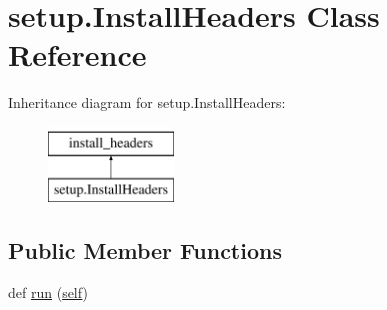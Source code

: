 \hypertarget{classsetup_1_1_install_headers}{}\section{setup.\+Install\+Headers Class Reference}
\label{classsetup_1_1_install_headers}
Inheritance diagram for setup.\+Install\+Headers\+:\begin{figure}[H]
\begin{center}
\leavevmode
\includegraphics[height=2.000000cm]{classsetup_1_1_install_headers}
\end{center}
\end{figure}
\subsection*{Public Member Functions}
\begin{DoxyCompactItemize}
\item 
def \mbox{\hyperlink{classsetup_1_1_install_headers_ae3939ef9299e7b4d7c2ed0614eef557a}{run}} (\mbox{\hyperlink{modsupport_8h_a0180ca1808366e5da641475e8bf8cca3}{self}})
\end{DoxyCompactItemize}
